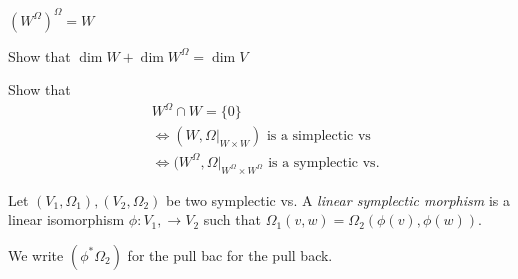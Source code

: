 \begin{exercise}
	$(W^\Omega)^\Omega = W$
\end{exercise}
\begin{exercise}
Show that $\dim W + \dim W^{\Omega} = \dim V$	
\end{exercise}
\begin{exercise}
	Show that 
	\begin{align*}
		& W^{\Omega} \cap W = \{0\} \\
		& \iff (W, \Omega|_{W\times W}) \text{ is a simplectic vs}\\
		& \iff (W^{\Omega}, \Omega|_{W^{\Omega}\times  W^\Omega} \text{ is a symplectic vs}
	.\end{align*}	
\end{exercise}

\begin{definition}
	Let $(V_1, \Omega_1) , (V_2, \Omega_2)$ be two symplectic vs. A \emph{linear symplectic morphism} is a linear isomorphism $\phi: V_1, \to V_2$ such that $\Omega_1(v,w) = \Omega_2(\phi(v), \phi(w))$.

	We write $(\phi^*\Omega_2) $ for the pull bac for the pull back.
\end{definition}

